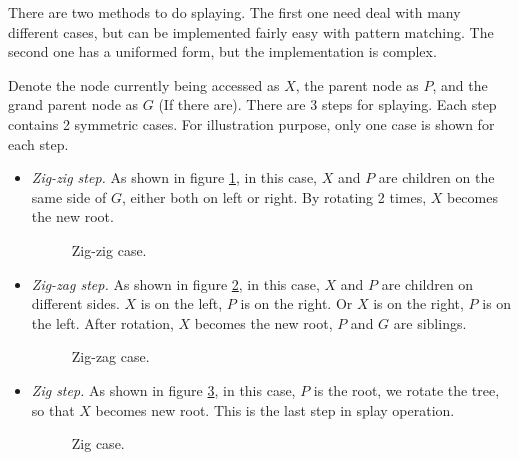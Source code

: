 \documentclass{article}
\begin{document}
There are two methods to do splaying. The first one need deal
with many different cases, but can be implemented fairly easy with
pattern matching. The second one has a uniformed form, but the implementation
is complex.

Denote the node currently being accessed as $X$, the parent node as $P$,
and the grand parent node as $G$ (If there are).  There are 3 steps for
splaying. Each step contains 2 symmetric cases. For illustration
purpose, only one case is shown for each step.

\begin{itemize}
\item {\em Zig-zig step.} As shown in figure \ref{fig:zig-zig}, in this case,
$X$ and $P$ are children on the same side of $G$, either both on left or right. By
rotating 2 times, $X$ becomes the new root.

\begin{figure}[htbp]
  \centering
  \caption{Zig-zig case.} \label{fig:zig-zig}
\end{figure}

\item {\em Zig-zag step.} As shown in figure \ref{fig:zig-zag}, in this
case, $X$ and $P$ are children on different sides. $X$ is on the left,
$P$ is on the right. Or $X$ is on the right, $P$ is on the left.
After rotation, $X$ becomes the new root, $P$ and $G$ are siblings.

\begin{figure}[htbp]
  \centering
  \caption{Zig-zag case.} \label{fig:zig-zag}
\end{figure}

\item {\em Zig step.} As shown in figure \ref{fig:zig}, in this case,
$P$ is the root, we rotate the tree, so that $X$ becomes new root.
This is the last step in splay operation.

\begin{figure}[htbp]
  \centering
  \caption{Zig case.} \label{fig:zig}
\end{figure}

\end{itemize}
\end{document}
